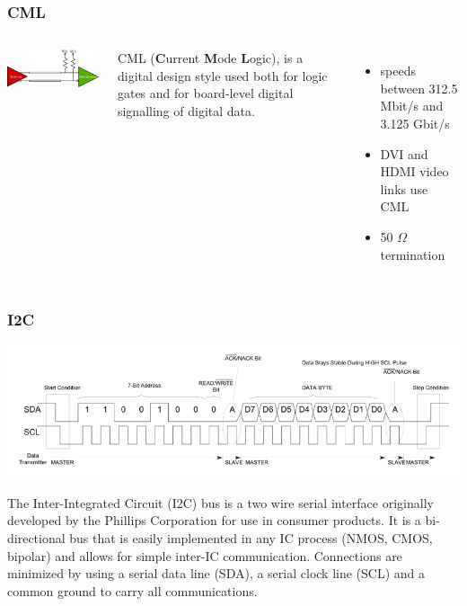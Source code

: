 \documentclass[aspectratio=169]{beamer}
\begin{document}
	\begin{frame}
		\frametitle{CML}
		\begin{columns}
			\begin{center}
				\includegraphics[width=0.95 \textwidth]{IMG/CML_line.png}
			\end{center}
			CML (\textbf{C}urrent \textbf{M}ode \textbf{L}ogic), is a digital design style used both for logic gates and for board-level digital signalling of digital data.
			\begin{itemize}
				\item speeds between 312.5 Mbit/s and 3.125 Gbit/s
				\item DVI and HDMI video links use CML
				\item 50 $\Omega$ termination
			\end{itemize}
		\end{columns}
	\end{frame}

	\begin{frame}
		\frametitle{I2C}
		\begin{center}
			\includegraphics[width=0.8 \textwidth]{IMG/I2C.png}
		\end{center}
		The Inter-Integrated Circuit (I2C) bus is a two wire serial interface originally developed by the Phillips Corporation for use in consumer products. It is a bi-directional bus that is easily implemented in any IC process (NMOS, CMOS, bipolar) and allows for simple inter-IC communication. Connections are minimized by using a serial data line (SDA), a serial clock line (SCL) and a common ground to carry all communications.
	\end{frame}
\end{document}

